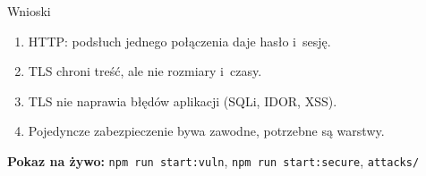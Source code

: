 \documentclass[aspectratio=169,10pt]{beamer}
\newcommand{\kod}[1]{\texttt{#1}}
\begin{document}
\begin{frame}{Wnioski}
\begin{enumerate}
\item HTTP: podsłuch jednego połączenia daje hasło i~sesję.
\item TLS chroni treść, ale nie rozmiary i~czasy.
\item TLS nie naprawia błędów aplikacji (SQLi, IDOR, XSS).
\item Pojedyncze zabezpieczenie bywa zawodne, potrzebne są warstwy.
\end{enumerate}
\vspace{5mm}
\textbf{Pokaz na żywo:} \kod{npm run start:vuln}, \kod{npm run start:secure}, \kod{attacks/}
\end{frame}
\end{document}
